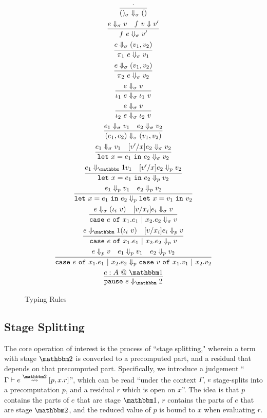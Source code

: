 \documentclass[11pt]{article}
\makeatletter
\newcommand {\bbone} {\mathbbm 1}
\newcommand {\bbtwo} {\mathbbm 2}
\newcommand {\at} {{\tt~@~}}
\newcommand {\pause} {{\tt pause}}
\newcommand {\letin} [3] {{\tt let}~{#1} = {#2}~{\tt in}~{#3}}
\newcommand {\caseof} [3] {{\tt case}~{#1} ~{\tt of}~{#2}~{\tt |}~{#3}}
\newcommand {\splits} {\overset{\bbtwo}\rightsquigarrow}
\newcommand {\inferenceSpacing}{\setlength{\jot}{1.8ex}}
\makeatother
\begin{document}
\newcommand {\downsig} {\Downarrow_\sigma} 
\newcommand {\downone} {\Downarrow_\bbone} 
\newcommand {\downtwo} {\Downarrow_\bbtwo} 
\newcommand {\downp} {\Downarrow_p} 
\begin{figure}
\caption{Typing Rules}
\label{fig:eval}
\inferenceSpacing
\begin{gather}
\infer {()_\sigma \downsig ()}{\cdot} \\
\infer {f~e \downsig v' }{e \downsig v & f~v \Downarrow v'} \\
\infer {\pi_1~e \downsig v_1 }{e \downsig (v_1, v_2)} \\
\infer {\pi_2~e \downsig v_2 }{e \downsig (v_1, v_2)} \\
\infer {\iota_1~e \downsig \iota_1~v}{e \downsig v} \\
\infer {\iota_2~e \downsig \iota_2~v}{e \downsig v} \\
\infer { (e_1,e_2) \downsig (v_1, v_2)}{e_1 \downsig v_1 & e_2 \downsig v_2} \\
\infer {\letin {x}{e_1}{e_2} \downsig v_2}{e_1 \downsig v_1 & [v'/x] e_2 \downsig v_2} \\
\infer {\letin {x}{e_1}{e_2} \downp v_2}{e_1 \downone v_1 & [v'/x] e_2 \downp v_2} \\
\infer {\letin {x}{e_1}{e_2} \downp \letin {x}{v_1}{v_2}}{e_1 \downp v_1 & e_2 \downp v_2} \\
\infer {\caseof {e}{x_1.e_1}{x_2.e_2} \downsig v}{e \downsig (\iota_i~v) & [v/x_i]e_i \downsig v} \\
\infer {\caseof {e}{x_1.e_1}{x_2.e_2} \downp v}{e \downone (\iota_i~v) & [v/x_i]e_i \downp v} \\
\infer {\caseof {e}{x_1.e_1}{x_2.e_2} \downp \caseof {v}{x_1.v_1}{x_2.v_2}}{e \downp v & e_1 \downp v_1 & e_2 \downp v_2} \\
\infer {\pause~e \downtwo }{e : A\at\bbone}
\end{gather}
\end{figure}

\subsection{Stage Splitting}

The core operation of interest is the process of ``stage splitting," wherein a term with stage $\bbtwo$ is converted to a precomputed part, and a residual that depends on that precomputed part.  Specifically, we introduce a judgement ``$\Gamma \vdash e \splits [p,x.r]$'', which can be read ``under the context $\Gamma$, $e$ stage-splits into a precomputation $p$, and a residual $r$ which is open on $x$''.  The idea is that $p$ contains the parts of $e$ that are stage $\bbone$, $r$ contains the parts of $e$ that are stage $\bbtwo$, and the reduced value of $p$ is bound to $x$ when evaluating $r$. 
\end{document}
